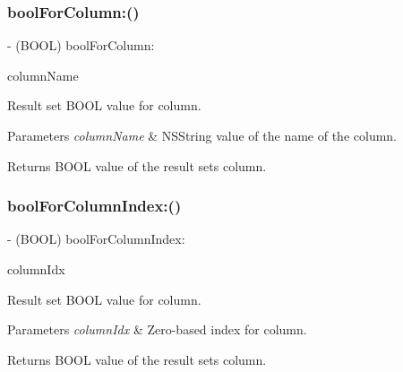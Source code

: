 \subsubsection{\texorpdfstring{bool\+For\+Column\+:()}{boolForColumn:()}}
{\footnotesize\ttfamily -\/ (B\+O\+OL) bool\+For\+Column\+: \begin{DoxyParamCaption}\item[{(N\+S\+String$\ast$)}]{column\+Name }\end{DoxyParamCaption}}

Result set {\ttfamily B\+O\+OL} value for column.


\begin{DoxyParams}{Parameters}
{\em column\+Name} & {\ttfamily N\+S\+String} value of the name of the column.\\
\hline
\end{DoxyParams}
\begin{DoxyReturn}{Returns}
{\ttfamily B\+O\+OL} value of the result set\textquotesingle{}s column. 
\end{DoxyReturn}
\mbox{\label{interface_o_p_t_l_y_f_m_d_b_result_set_a3621b2d8e197c699958d4f2d21eb764e}} 
\subsubsection{\texorpdfstring{bool\+For\+Column\+Index\+:()}{boolForColumnIndex:()}}
{\footnotesize\ttfamily -\/ (B\+O\+OL) bool\+For\+Column\+Index\+: \begin{DoxyParamCaption}\item[{(int)}]{column\+Idx }\end{DoxyParamCaption}}

Result set {\ttfamily B\+O\+OL} value for column.


\begin{DoxyParams}{Parameters}
{\em column\+Idx} & Zero-\/based index for column.\\
\hline
\end{DoxyParams}
\begin{DoxyReturn}{Returns}
{\ttfamily B\+O\+OL} value of the result set\textquotesingle{}s column. 
\end{DoxyReturn}
\mbox{\label{interface_o_p_t_l_y_f_m_d_b_result_set_a446f25547db5f2b36547ea9f2da75529}} 
